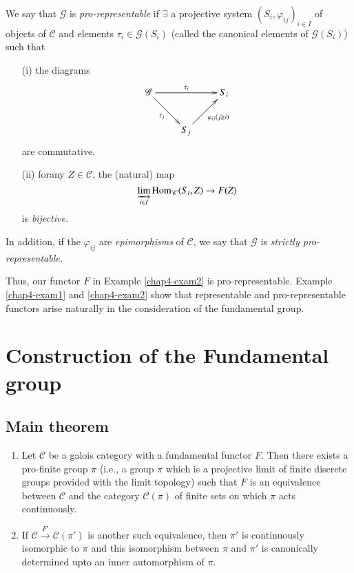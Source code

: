 \begin{defin}\label{chap4-defi4.3.2}
We say that $\mathscr{G}$ is {\em pro-representable} if $\exists$ a
projective system $(S_{i},\varphi_{ij})_{i\in I}$ of objects of
$\mathscr{C}$ and elements $\tau_{i}\in\mathscr{G}(S_{i})$ (called the
canonical elements of $\mathscr{G}(S_{i})$) such that 
\begin{itemize}
\item[\rm(i)] the diagrams
\[
\xymatrix{
\mathscr{G}\ar[rr]^{\tau_{i}}\ar[dr]_{\tau_{j}} && S_{i}\\
 & S_{j}\ar[ur]_{\varphi_{ij}(j\geq i)} & 
}
\]
are commutative.

\item[\rm(ii)] for\pageoriginale any $Z\in\mathscr{C}$, the (natural) map
$$
\varinjlim_{i\in I} \operatorname{Hom}_{\mathscr{C}}(S_{i},Z)\to F(Z)
$$
is {\em bijective.}
\end{itemize}
\end{defin}

In addition, if the $\varphi_{ij}$ are {\em epimorphisms} of
$\mathscr{C}$, we say that $\mathscr{G}$ is {\em strictly
  pro-representable.}

Thus, our functor $F$ in Example \ref{chap4-exam2} is
pro-representable. Example \ref{chap4-exam1} and \ref{chap4-exam2} show that
representable and pro-representable functors arise naturally in the
consideration of the fundamental group.

\section{Construction of the Fundamental group}\label{chap4-sec4.4}

\subsection{Main theorem}\label{chap4-sec4.4.1}

\begin{enumerate}
\renewcommand{\labelenumi}{(\theenumi)}
\item Let $\mathscr{C}$ be a galois category with a fundamental
  functor $F$. Then there exists a pro-finite group $\pi$ (i.e., a
  group $\pi$ which is a projective limit of finite discrete groups
  provided with the limit topology) such that $F$ is an equivalence
  between $\mathscr{C}$ and the category $\mathscr{C}(\pi)$ of finite
  sets on which $\pi$ acts continuously.

\item If $\mathscr{C}\xrightarrow{F'}\mathscr{C}(\pi')$ is another
  such equivalence, then $\pi'$ is continuously isomorphic to $\pi$
  and this isomorphism between $\pi$ and $\pi'$ is canonically
  determined upto an inner automorphism of $\pi$.
\end{enumerate}

